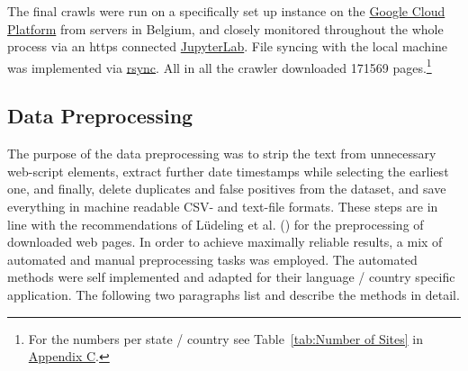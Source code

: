 The final crawls were run on a specifically set up instance on the \href{https://cloud.google.com/}{Google Cloud Platform} from servers in Belgium, and closely monitored throughout the whole process via an https connected \href{https://jupyterlab.readthedocs.io/en/stable/}{JupyterLab}. File syncing with the local machine was implemented via \href{https://linux.die.net/man/1/rsync}{rsync}. All in all the crawler downloaded 171569 pages.\footnote{For the numbers per state / country see Table~\ref{tab:Number of Sites} in \hyperref[Appendix C]{Appendix C}.}


\subsection{Data Preprocessing}\label{Data Preprocessing}
The purpose of the data  preprocessing was to strip the text from unnecessary web-script elements, extract further date timestamps while selecting the earliest one, and finally, delete duplicates and false positives from the dataset, and save everything in machine readable CSV- and text-file formats. These steps are in line with the recommendations of Lüdeling et al. (\cite*[p. 19]{Ludeling2015}) for the preprocessing of downloaded web pages. In order to achieve maximally reliable results, a mix of automated and manual preprocessing tasks was employed. The automated methods were self implemented and adapted for their language / country specific application. The following two paragraphs list and describe the methods in detail.\par
